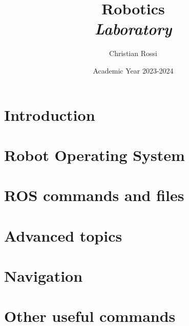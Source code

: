 \documentclass[12pt, a4paper]{report}
\title{Robotics \\ \textit{Laboratory}}
\author{Christian Rossi}
\date{Academic Year 2023-2024}
\begin{document}
    \maketitle

    

    \cleardoublepage

    \tableofcontents

    \cleardoublepage

    \chapter{Introduction}
    
    

    \chapter{Robot Operating System}
    
    
    

    \chapter{ROS commands and files}
    
     
     
     
     
     
     
     
     
     

    \chapter{Advanced topics}
    
    
    
    
    
    

    \chapter{Navigation}
    
    

    \appendix
    \chapter{Other useful commands}
    
\end{document}
